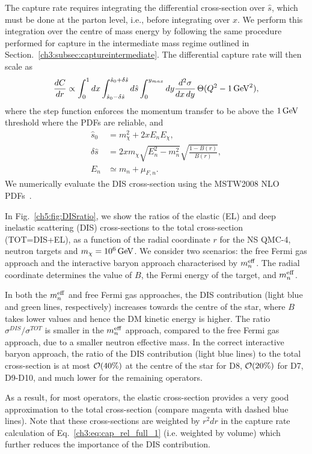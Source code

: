 The capture rate requires integrating the differential cross-section over $\hat{s}$, which must be done at the parton level, i.e., before integrating over $x$. We perform this integration over the centre of mass energy by following the same procedure performed for capture in the intermediate mass regime outlined in Section.~\ref{ch3:subsec:captureintermediate}. The differential capture rate will then scale as 
\begin{align}
   \frac{dC}{dr}\propto \int_0^1 dx\int_{\hat{s}_0-\delta\hat{s}}^{\hat{s}_0+\delta\hat{s}}d\hat{s}\int_0^{y_{max}}dy  \frac{d^2\sigma}{dx\, dy} \,\Theta(Q^2 -1{\rm \,GeV}^2), \label{eq:DIS}
\end{align}
where the step function enforces the momentum transfer to be above the $1{\rm \,GeV}$ threshold where the PDFs are reliable, and 
\begin{align}
    \hat{s}_0 & = m_\chi^2 + 2x E_n E_\chi,\\
    \delta\hat{s} & = 2xm_\chi \sqrt{E_n^2 -m_n^2}\sqrt{\frac{1-B(r)}{B(r)}},\\
    E_n & \simeq m_n + \mu_{F,n}. 
\end{align}
We numerically evaluate the DIS cross-section using the MSTW2008 NLO PDFs~\cite{Martin:2009iq_PartondistributionsLHC}. 

In Fig.~\ref{ch5:fig:DISratio}, we show the ratios of the elastic (EL) and deep inelastic scattering (DIS) cross-sections
to the total cross-section (TOT=DIS+EL),  as a function of the radial coordinate $r$ for the NS  QMC-4, neutron targets and $m_\chi=10^6{\rm \,GeV}$. We consider two scenarios: the free Fermi gas approach and the interactive baryon approach characterised by $m_n^{\rm eff}$. The radial coordinate determines the value of $B$, the Fermi energy of the target, and $m_n^{\rm eff}$. 

In both the $m_n^{\rm eff}$ and free Fermi gas approaches, the DIS contribution (light blue and green lines, respectively) increases towards the centre of the star, where $B$ takes lower values and hence the DM kinetic energy is higher. The ratio $\sigma^{DIS}/\sigma^{TOT}$ is smaller in the $m_n^{\rm eff}$ approach, compared to the free Fermi gas approach, due to a smaller neutron effective mass. In the correct interactive baryon approach, the ratio of the DIS contribution (light blue lines) to the total cross-section is at most ${\cal O}(40\%)$ at the centre of the star for D8, ${\cal O}(20\%)$ for D7, D9-D10, and much lower for the remaining operators.  

As a result, for most operators, the elastic cross-section provides a very good approximation to the total cross-section (compare magenta with dashed blue lines).
Note that these cross-sections are weighted by $r^2dr$ in the capture rate calculation of Eq.~\ref{ch3:eq:cap_rel_full_1} (i.e. weighted by volume) which further reduces the importance of the DIS contribution. 

